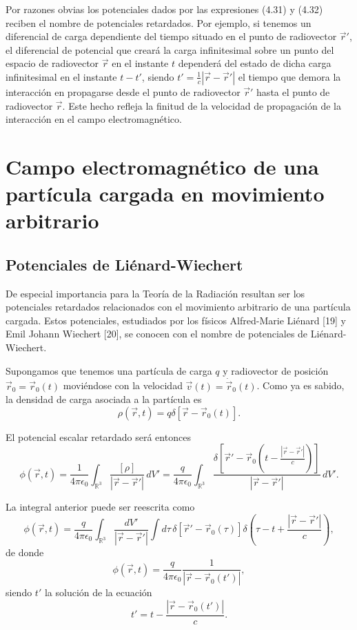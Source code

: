 \documentclass[12pt,a4paper]{book}
\begin{document}
Por razones obvias los potenciales dados por las expresiones (4.31) y (4.32) reciben el nombre de potenciales retardados. Por ejemplo, si tenemos un diferencial de carga dependiente del tiempo situado en el punto de radiovector $\vec{r}'$, el diferencial de potencial que creará la carga infinitesimal sobre un punto del espacio de radiovector $\vec{r}$ en el instante $t$ dependerá del estado de dicha carga infinitesimal en el instante $t - t'$, siendo $t' = \frac{1}{c}|\vec{r} - \vec{r}'|$ el tiempo que demora la interacción en propagarse desde el punto de radiovector $\vec{r}'$ hasta el punto de radiovector $\vec{r}$. Este hecho refleja la finitud de la velocidad de propagación de la interacción en el campo electromagnético.

\section{Campo electromagnético de una partícula cargada en movimiento arbitrario}
\subsection{Potenciales de Liénard-Wiechert}

De especial importancia para la Teoría de la Radiación resultan ser los potenciales retardados relacionados con el movimiento arbitrario de una partícula cargada. Estos potenciales, estudiados por los físicos Alfred-Marie Liénard [19] y Emil Johann Wiechert [20], se conocen con el nombre de potenciales de Liénard-Wiechert.

Supongamos que tenemos una partícula de carga $q$ y radiovector de posición $\vec{r}_0 = \vec{r}_0(t)$ moviéndose con la velocidad $\vec{v}(t) = \dot{\vec{r}}_0(t)$. Como ya es sabido, la densidad de carga asociada a la partícula es
\begin{equation}
\rho(\vec{r}, t) = q\delta[\vec{r} - \vec{r}_0(t)].
\end{equation}

El potencial escalar retardado será entonces
\begin{equation}
\phi(\vec{r}, t) = \frac{1}{4\pi\epsilon_0}\int_{\mathbb{R}^3} \frac{[\rho]}{|\vec{r} - \vec{r}'|}\,dV' = \frac{q}{4\pi\epsilon_0}\int_{\mathbb{R}^3} \frac{\delta\left[\vec{r}' - \vec{r}_0\left(t - \frac{|\vec{r} - \vec{r}'|}{c}\right)\right]}{|\vec{r} - \vec{r}'|}\,dV'.
\end{equation}

La integral anterior puede ser reescrita como
\begin{equation}
\phi(\vec{r}, t) = \frac{q}{4\pi\epsilon_0}\int_{\mathbb{R}^3} \frac{dV'}{|\vec{r} - \vec{r}'|}\int d\tau\,\delta[\vec{r}' - \vec{r}_0(\tau)]\delta\left(\tau - t + \frac{|\vec{r} - \vec{r}'|}{c}\right),
\end{equation}
de donde
\begin{equation}
\phi(\vec{r}, t) = \frac{q}{4\pi\epsilon_0}\frac{1}{|\vec{r} - \vec{r}_0(t')|},
\end{equation}
siendo $t'$ la solución de la ecuación
\begin{equation}
t' = t - \frac{|\vec{r} - \vec{r}_0(t')|}{c}.
\end{equation}
\end{document}
